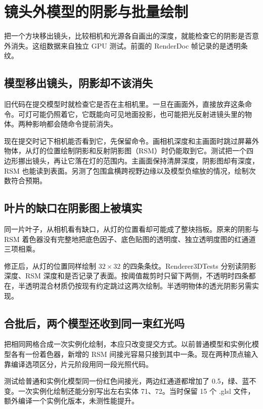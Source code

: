 \section{镜头外模型的阴影与批量绘制}\label{sec:3d-review}
把一个方块移出镜头，比较相机和光源各自画出的深度，就能检查它的阴影是否意外消失。这组数据来自独立 GPU 测试。前面的 RenderDoc 帧记录的是透明条纹。

\subsection{模型移出镜头，阴影却不该消失}
旧代码在提交模型时就检查它是否在主相机里。一旦在画面外，直接放弃这条命令。可灯可能仍照着它，它既能向可见地面投影，也可能把光反射进镜头里的物体。两种影响都会随命令提前消失。

现在提交时记下相机能否看到它，先保留命令。画相机深度和主画面时跳过屏幕外物体，从灯的位置绘制阴影和反射阴影图（RSM）时仍能取到它。测试把一个四边形挪出镜头，再让它落在灯的范围内。主画面保持清屏深度，阴影图却有深度，RSM 也能读到表面。另测了包围盒横跨视野边缘以及模型负缩放的情况，绘制次数符合预期。

\subsection{叶片的缺口在阴影图上被填实}
同一片叶子，从相机看有缺口，从灯的位置看却可能成了整块挡板。原来的阴影与 RSM 着色器没有完整地把底色因子、底色贴图的透明度、独立透明度图的红通道三项相乘。

修正后，从灯的位置同样绘制 $32\times32$ 的四条条纹。Renderer3DTests 分别读阴影深度、RSM 深度和是否记录了表面。按阈值裁剪时只留下两侧，不透明时四条都在，半透明混合材质仍按现有约定跳过这两次绘制。半透明物体的透光阴影另需实现。

\subsection{合批后，两个模型还收到同一束红光吗}
把相同网格合成一次实例化绘制，本应只改变提交方式。以前普通模型和实例化模型各有一份着色器，新增的 RSM 间接光容易只接到其中一条。现在两种顶点输入靠编译选项区分，片元阶段用同一段光照代码。

测试给普通和实例化模型同一份红色间接光，两边红通道都增加了 0.5，绿、蓝不变。一次实例化绘制还能分别写出左右实体 71、72。当时保留 15 个 .glsl 文件，额外编译一个实例化版本，未测性能提升。

